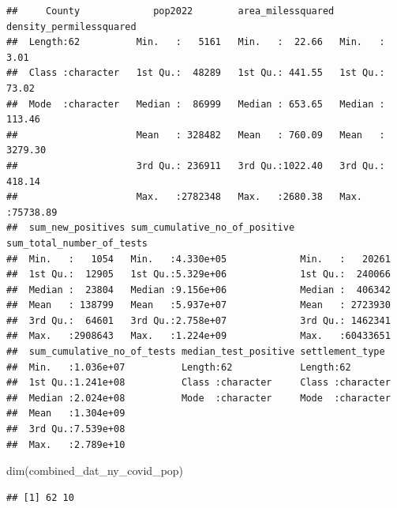 \documentclass[
  12pt,
]{article}
\newenvironment{Shaded}{\begin{snugshade}}{\end{snugshade}}
\newcommand{\FunctionTok}[1]{\textcolor[rgb]{0.00,0.00,0.00}{#1}}
\newcommand{\NormalTok}[1]{#1}
\begin{document}
\begin{verbatim}
##     County             pop2022        area_milessquared density_permilessquared
##  Length:62          Min.   :   5161   Min.   :  22.66   Min.   :    3.01       
##  Class :character   1st Qu.:  48289   1st Qu.: 441.55   1st Qu.:   73.02       
##  Mode  :character   Median :  86999   Median : 653.65   Median :  113.46       
##                     Mean   : 328482   Mean   : 760.09   Mean   : 3279.30       
##                     3rd Qu.: 236911   3rd Qu.:1022.40   3rd Qu.:  418.14       
##                     Max.   :2782348   Max.   :2680.38   Max.   :75738.89       
##  sum_new_positives sum_cumulative_no_of_positive sum_total_number_of_tests
##  Min.   :   1054   Min.   :4.330e+05             Min.   :   20261         
##  1st Qu.:  12905   1st Qu.:5.329e+06             1st Qu.:  240066         
##  Median :  23804   Median :9.156e+06             Median :  406342         
##  Mean   : 138799   Mean   :5.937e+07             Mean   : 2723930         
##  3rd Qu.:  64601   3rd Qu.:2.758e+07             3rd Qu.: 1462341         
##  Max.   :2908643   Max.   :1.224e+09             Max.   :60433651         
##  sum_cumulative_no_of_tests median_test_positive settlement_type   
##  Min.   :1.036e+07          Length:62            Length:62         
##  1st Qu.:1.241e+08          Class :character     Class :character  
##  Median :2.024e+08          Mode  :character     Mode  :character  
##  Mean   :1.304e+09                                                 
##  3rd Qu.:7.539e+08                                                 
##  Max.   :2.789e+10
\end{verbatim}

\begin{Shaded}
\begin{Highlighting}[]
\FunctionTok{dim}\NormalTok{(combined\_dat\_ny\_covid\_pop)}
\end{Highlighting}
\end{Shaded}

\begin{verbatim}
## [1] 62 10
\end{verbatim}
\end{document}
